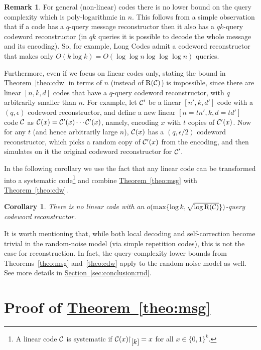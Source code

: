 \documentclass[10pt]{article}
\newtheorem{corollary}[theorem]{Corollary}
\theoremstyle{definition}
\newtheorem{remark}[theorem]{Remark}
\numberwithin{equation}{section}
\newcommand{\expref}[2]{\texorpdfstring{\hyperref[#2]{#1~\ref{#2}}}{#1~\ref{#2}}}
\newcommand{\CC}{{\cal C}}
\newcommand{\zo}{{\{0,1\}}}
\newcommand{\drows}{{{\mathrm{R}} }}
\newcommand{\rst}[1]{\ensuremath{{\mathbin\upharpoonright}%
\raise-.9ex\hbox{$#1$}}}
\begin{document}
\begin{remark} \label{rmk:whyrows}
For general (non-linear) codes there is no lower bound on the query complexity which is poly-logarithmic in $n$. This follows from a simple observation that if a code has a $q$-query message reconstructor then it also has a $qk$-query codeword reconstructor (in $qk$ queries it is possible to decode the whole message and its encoding). So, for example, Long Codes admit a codeword reconstructor that makes
only $O(k\log k) = O(\log \log n \log \log \log n)$ queries.

Furthermore, even if we focus on linear codes only, stating the bound in \expref{Theorem}{theo:cdw} in terms of $n$ (instead of $\drows(\CC)$) is impossible, since there are linear $[n,k,d]$ codes that have a $q$-query codeword reconstructor, with $q$ arbitrarily smaller than $n$. For example, let $\CC'$ be a linear $[n',k,d']$ code
with a $(q,\epsilon)$ codeword reconstructor, and define a new linear $[n=tn',k,d=td']$ code $\CC$ as $\CC(x) = \CC'(x) \cdots \CC'(x)$, namely, encoding $x$ with $t$ copies of $\CC'(x)$. Now for any $t$ (and hence arbitrarily large $n$), $\CC(x)$ has a $(q,\epsilon/2)$ codeword reconstructor, which picks a random copy of $\CC'(x)$ from the encoding, and then simulates on it the original codeword reconstructor for $\CC'$.
\end{remark}

In the following corollary we use the fact that any linear code can be transformed into a systematic code\footnote{A linear code $\CC$ is systematic if  $\CC(x)\rst{[k]} = x$ for all $x \in \zo^k$.} and combine \expref{Theorem}{theo:msg} with \expref{Theorem}{theo:cdw}.

\begin{corollary}
There is no linear code with an $o(\max\{\log k,\sqrt{\log \drows(\CC)}\})$-query codeword reconstructor.
\end{corollary}

It is worth mentioning that, while both local decoding and 
%
self-correction
become trivial in the random-noise model (via simple repetition codes), this is not the case for reconstruction. In fact, the query-complexity lower bounds from Theorems~\ref{theo:msg} and~\ref{theo:cdw} apply to the random-noise model as well. See more details in \expref{Section}{sec:conclusion:rnd}.

\section{Proof of \expref{Theorem}{theo:msg}} \label{sec:msg}
\end{document}
